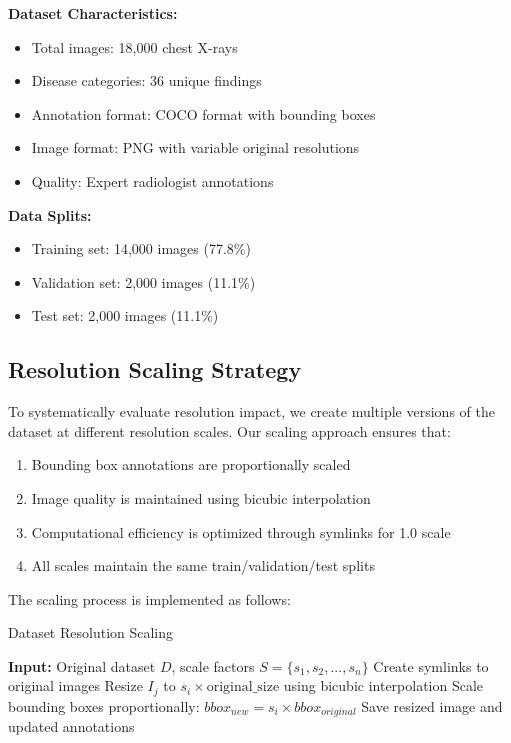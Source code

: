 \documentclass[10pt,twocolumn]{article}
\begin{document}
\textbf{Dataset Characteristics:}
\begin{itemize}
\item Total images: 18,000 chest X-rays
\item Disease categories: 36 unique findings
\item Annotation format: COCO format with bounding boxes
\item Image format: PNG with variable original resolutions
\item Quality: Expert radiologist annotations
\end{itemize}

\textbf{Data Splits:}
\begin{itemize}
\item Training set: 14,000 images (77.8\%)
\item Validation set: 2,000 images (11.1\%)
\item Test set: 2,000 images (11.1\%)
\end{itemize}

\subsection{Resolution Scaling Strategy}

To systematically evaluate resolution impact, we create multiple versions of the dataset at different resolution scales. Our scaling approach ensures that:

\begin{enumerate}
\item Bounding box annotations are proportionally scaled
\item Image quality is maintained using bicubic interpolation
\item Computational efficiency is optimized through symlinks for 1.0 scale
\item All scales maintain the same train/validation/test splits
\end{enumerate}

The scaling process is implemented as follows:

\begin{algorithm}
\caption{Dataset Resolution Scaling}
\begin{algorithmic}[1]
\STATE \textbf{Input:} Original dataset $D$, scale factors $S = \{s_1, s_2, ..., s_n\}$
        \STATE Create symlinks to original images
    \ELSE
            \STATE Resize $I_j$ to $s_i \times \text{original\_size}$ using bicubic interpolation
            \STATE Scale bounding boxes proportionally: $bbox_{new} = s_i \times bbox_{original}$
            \STATE Save resized image and updated annotations
        \ENDFOR
    \ENDIF
\ENDFOR
\end{algorithmic}
\end{algorithm}
\end{document}
